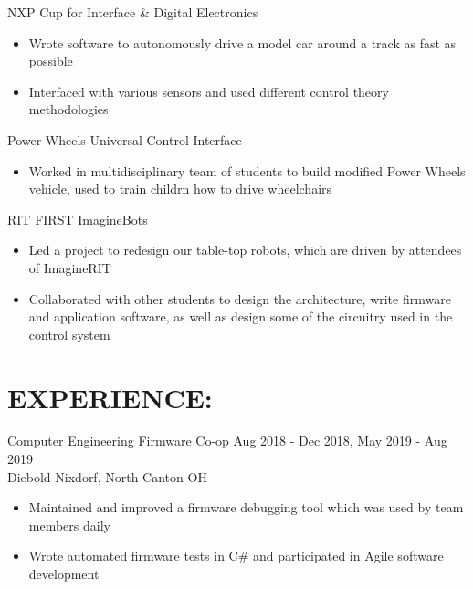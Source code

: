 \documentclass[line,margin]{res}
\begin{document}
\begin{resume}

		NXP Cup for Interface \& Digital Electronics
		\begin{itemize}
			\item Wrote software to autonomously drive a model car around a track as fast as possible
			\item Interfaced with various sensors and used different control theory methodologies
		\end{itemize}
		\vspace{-10pt}

		Power Wheels Universal Control Interface
		\begin{itemize}
			\item Worked in multidisciplinary team of students to build modified Power Wheels vehicle, used to train childrn how to drive wheelchairs
		\end{itemize}
		\vspace{-10pt}

		RIT FIRST ImagineBots
		\begin{itemize}
			\item Led a project to redesign our table-top robots, which are driven by attendees of ImagineRIT 
			\item Collaborated with other students to design the architecture, write firmware and application software, as well as design some of the circuitry used in the control system
		\end{itemize}

	\section{EXPERIENCE:}

		Computer Engineering Firmware Co-op \hfill Aug 2018 - Dec 2018, May 2019 - Aug 2019\\
		Diebold Nixdorf, North Canton OH
		\begin{itemize}
			\item Maintained and improved a firmware debugging tool which was used by team members daily
			\item Wrote automated firmware tests in C\# and participated in Agile software development
		\end{itemize}
		\vspace{-8pt}


\end{resume}
\end{document}
